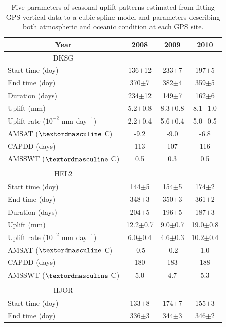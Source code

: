 \clearpage
\begin{center}
\begin{ThreePartTable}
\begin{longtable}{lccc}
\caption{Five parameters of seasonal uplift patterns estimated from fitting GPS vertical data to a cubic spline model and parameters describing both atmospheric and oceanic condition at each GPS site.}\\
\midrule 
\multicolumn{1}{c}{Year} & 2008 & 2009 & 2010 \\
\midrule 
\multicolumn{1}{c}{DKSG} & & & \\
				Start time (doy) & 136$\pm$12 & 233$\pm$7 & 197$\pm$5\\
				End time (doy) & 370$\pm$7 & 382$\pm$4 & 359$\pm$5\\
				Duration (days) & 234$\pm$12 & 149$\pm$7 & 162$\pm$6\\
				Uplift (mm) & 5.2$\pm$0.8 & 8.3$\pm$0.8 & 8.1$\pm$1.0\\
				Uplift rate ($10^{-2}$ mm day$^{-1}$) & 2.2$\pm$0.4 & 5.6$\pm$0.4 & 5.0$\pm$0.5\\
				AMSAT ($\textordmasculine$ C) & -9.2 & -9.0 & -6.8\\
				CAPDD (days) & 113 & 107 & 116\\
				AMSSWT ($\textordmasculine$ C) & 0.5 & 0.3 & 0.5\\
				&  &  & \\
				\multicolumn{1}{c}{HEL2} & & & \\
				Start time (doy) & 144$\pm$5 & 154$\pm$5 & 174$\pm$2\\
				End time (doy) & 348$\pm$3 & 350$\pm$3 & 361$\pm$2\\
				Duration (days) & 204$\pm$5 & 196$\pm$5 & 187$\pm$3\\
				Uplift (mm) & 12.2$\pm$0.7 & 9.0$\pm$0.7 & 19.0$\pm$0.8\\
				Uplift rate ($10^{-2}$ mm day$^{-1}$) & 6.0$\pm$0.4 & 4.6$\pm$0.3 & 10.2$\pm$0.4\\
				AMSAT ($\textordmasculine$ C) & -0.5 & -0.2 & 1.0\\
				CAPDD (days) & 180 & 183 & 188\\
				AMSSWT ($\textordmasculine$ C) & 5.0 & 4.7 & 5.3\\
				&  &  & \\
				\multicolumn{1}{c}{HJOR} & & & \\
				Start time (doy) & 133$\pm$8 & 174$\pm$7 & 155$\pm$3\\
				End time (doy) & 336$\pm$3 & 344$\pm$3 & 346$\pm$2\\

\end{longtable}
\end{ThreePartTable}
\end{center}
